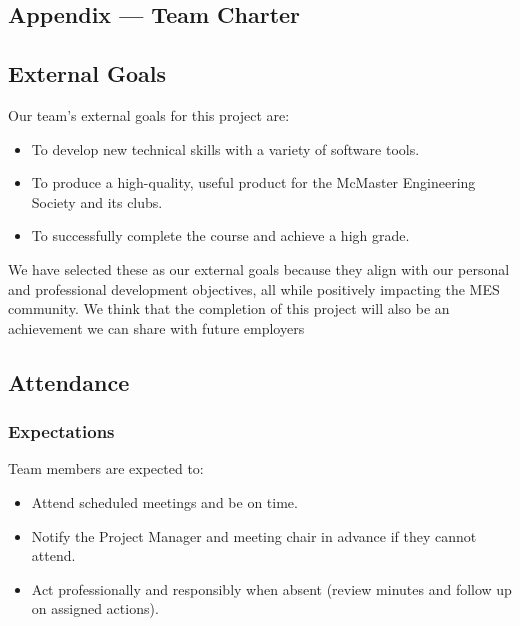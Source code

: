 \documentclass{article}
\begin{document}
\begin{enumerate}
\newpage{}

\section*{Appendix --- Team Charter}


\subsection*{External Goals}


Our team's external goals for this project are:
\begin{itemize}
  \item To develop new technical skills with a variety of software tools.
  \item To produce a high-quality, useful product for the McMaster Engineering Society and its clubs.
  \item To successfully complete the course and achieve a high grade.
\end{itemize}

We have selected these as our external goals because they align with our personal and professional development objectives, all while positively impacting the MES community. We think that the completion of this project will also be an achievement we can share with future employers


\subsection*{Attendance}

\subsubsection*{Expectations}

Team members are expected to: 
\begin{itemize}
  \item Attend scheduled meetings and be on time.
  \item Notify the Project Manager and meeting chair in advance if they cannot attend.
  \item Act professionally and responsibly when absent (review minutes and follow up on assigned actions).
\end{itemize}


\end{enumerate}
\end{document}
